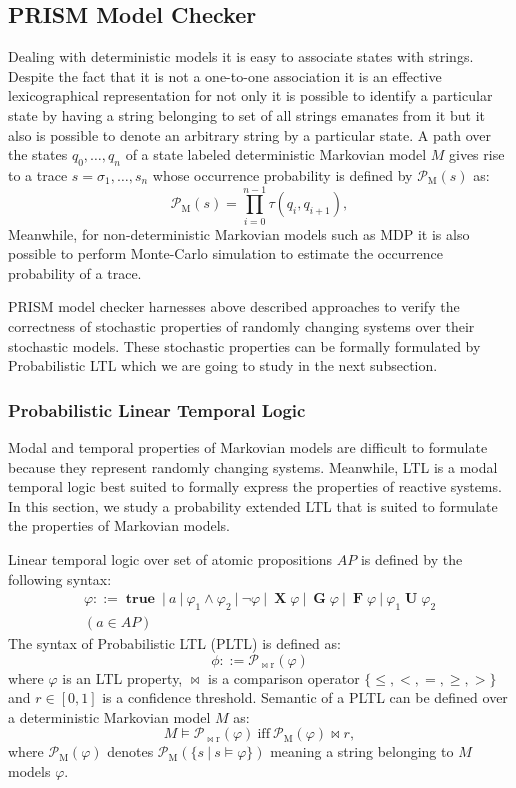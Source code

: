 \documentclass[
a4paper,
12pt
]{scrartcl}
\newcommand\true {\operatorname {\mathbf{true}}}
\newcommand\X{ \operatorname {\mathbf{X}}}
\newcommand\G{ \operatorname {\mathbf{G}}}
\newcommand\F{ \operatorname {\mathbf{F}}}
\newcommand\U{ \operatorname {\mathbf{U}}}
\newcommand\Prob[1]{ \operatorname {\mathcal{P}_{#1}}}
\begin{document}
\subsection{PRISM Model Checker}
Dealing with deterministic models it is easy to associate states with strings. Despite the fact that it is not a one-to-one association it is an effective lexicographical representation for not only it is possible to identify a particular state by having a string belonging to set of all strings emanates from it but it also is possible to denote an arbitrary string by a particular state.
A path over the states $q_0, \dots, q_n$ of a state labeled deterministic Markovian model $M$ gives rise to a trace $s = \sigma_1, \dots, s_n$ whose occurrence probability is defined by $\Prob{M}(s)$ as:
\begin{equation*}
  \Prob{M}(s) = \prod_{i=0}^{n-1}\tau(q_i,q_{i+1}),
\end{equation*}
Meanwhile, for non-deterministic Markovian models such as MDP it is also possible to perform Monte-Carlo simulation to estimate the occurrence probability of a trace.
\par PRISM model checker harnesses above described approaches to verify the correctness of stochastic properties of randomly changing systems over their stochastic models. These stochastic properties can be formally formulated by Probabilistic LTL which we are going to study in the next subsection.
\subsubsection{Probabilistic Linear Temporal Logic}
Modal and temporal properties of Markovian models are difficult to formulate because they represent randomly changing systems. Meanwhile, LTL is a modal temporal logic best suited to formally express the properties of reactive systems. In this section, we study a probability extended LTL that is suited to formulate the properties of Markovian models.
\par Linear temporal logic over set of atomic propositions $AP$ is defined by the following syntax:
\begin{multline*}
  \varphi ::= \true~|~a~|~\varphi_1 \land \varphi_2~|~\neg \varphi~|~\X \varphi~|~\G \varphi~|~\F \varphi~|~\varphi_1 \U \varphi_2 \\
  (a \in AP)
\end{multline*}
The syntax of Probabilistic LTL (PLTL) is defined as:
\begin{equation*}
  \phi ::= \Prob{\bowtie r} (\varphi)
\end{equation*}
where $\varphi$ is an LTL property, $\bowtie$ is a comparison operator $\{\leq, <, =, \geq, >\}$ and $r \in [0,1]$ is a confidence threshold.
Semantic of a PLTL can be defined over a deterministic Markovian model $M$ as:
\begin{equation*}
  M \models \Prob{\bowtie r}(\varphi)~\text{iff}~ \Prob{M}(\varphi) \bowtie r,
\end{equation*}
where $\Prob{M}(\varphi)$ denotes $\Prob{M}(\{s~|~s \models \varphi \})$ meaning a string belonging to $M$ models $\varphi$.
\end{document}
